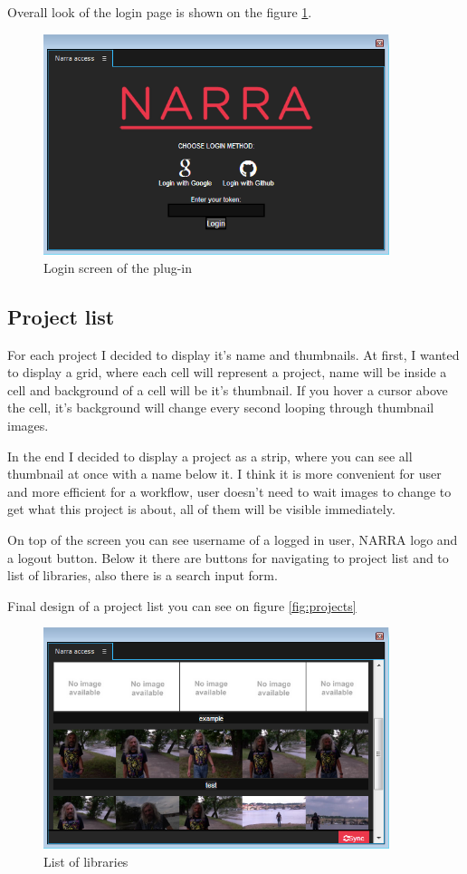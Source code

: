 \documentclass[thesis=B,english]{FITthesis}[2012/10/20]
\begin{document}
Overall look of the login page is shown on the figure \ref{fig:login}.
	\begin{figure}
		\centering
		\includegraphics[width=0.9\textwidth]{LoginPage.png}
		\caption{Login screen of the plug-in}\label{fig:login}
	\end{figure}
\subsection{Project list}
For each project I decided to display it's name and thumbnails. At first, I wanted to display a grid, where each cell will represent a project, name will be inside a cell and background of a cell will be it's thumbnail. If you hover a cursor above the cell, it's background will change every second looping through thumbnail images.

In the end I decided to display a project as a strip, where you can see all thumbnail at once with a name below it. I think it is more convenient for user and more efficient for a workflow, user doesn't need to wait images to change to get what this project is about, all of them will be visible immediately.

On top of the screen you can see username of a logged in user, NARRA logo and a logout button. Below it there are buttons for navigating to project list and to list of libraries, also there is a search input form.

Final design of a project list you can see on figure \ref{fig:projects}
	\begin{figure}
		\centering
		\includegraphics[width=0.9\textwidth]{libraries.png}
		\caption{List of libraries}\label{fig:libraries}
	\end{figure}
\end{document}
